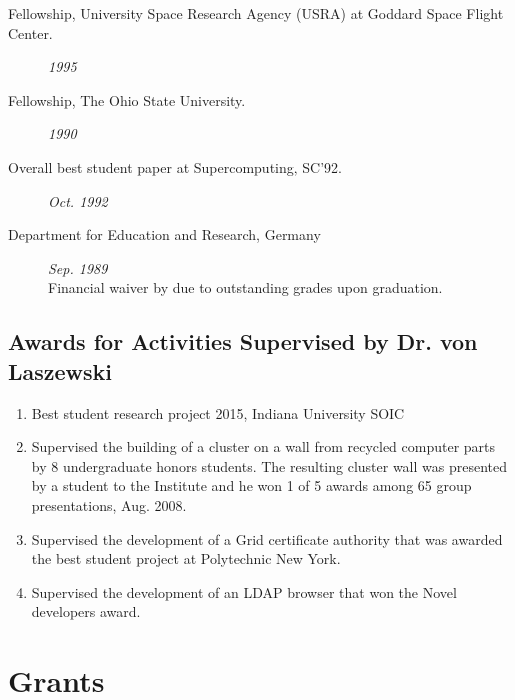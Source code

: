 \documentclass{article}
\begin{document}
\begin{description}
\item[Fellowship, University Space Research Agency (USRA) at Goddard Space Flight Center. ] \hfill {\it 1995}

\item[Fellowship, The Ohio State University. ] \hfill {\it 1990}

\item[Overall best student paper at Supercomputing‚ SC’92. ] \hfill {\it Oct. 1992}

\item[Department for Education and Research, Germany] \hfill {\it Sep. 1989} ~\\
  Financial waiver by due to outstanding grades upon graduation.
  
\end{description}


\subsection{Awards for Activities Supervised by Dr. von Laszewski}

\begin{enumerate}
  \item Best student research project 2015, Indiana University SOIC
  \item Supervised the building of a cluster on a wall from recycled computer parts by 8 undergraduate honors students. The resulting cluster wall was presented by a student to the Institute and he won 1 of 5 awards among 65 group presentations, Aug. 2008.
  \item  Supervised the development of a Grid certificate authority that was awarded the best student project at Polytechnic New York. 
  \item  Supervised the development of an LDAP browser that won the Novel developers award.
\end{enumerate}



\section{Grants}
\end{document}
